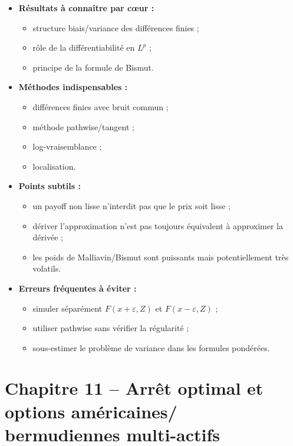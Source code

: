 \documentclass[11pt,a4paper]{article}
\begin{document}
\begin{itemize}
  \item \textbf{Résultats à connaître par cœur :}
  \begin{itemize}
    \item structure biais/variance des différences finies ;
    \item rôle de la différentiabilité en $L^p$ ;
    \item principe de la formule de Bismut.
  \end{itemize}
  \item \textbf{Méthodes indispensables :}
  \begin{itemize}
    \item différences finies avec bruit commun ;
    \item méthode pathwise/tangent ;
    \item log-vraisemblance ;
    \item localisation.
  \end{itemize}
  \item \textbf{Points subtils :}
  \begin{itemize}
    \item un payoff non lisse n'interdit pas que le prix soit lisse ;
    \item dériver l'approximation n'est pas toujours équivalent à approximer la dérivée ;
    \item les poids de Malliavin/Bismut sont puissants mais potentiellement très volatils.
  \end{itemize}
  \item \textbf{Erreurs fréquentes à éviter :}
  \begin{itemize}
    \item simuler séparément $F(x+\varepsilon,Z)$ et $F(x-\varepsilon,Z)$ ;
    \item utiliser pathwise sans vérifier la régularité ;
    \item sous-estimer le problème de variance dans les formules pondérées.
  \end{itemize}
\end{itemize}

\section[Chapitre 11 -- Arrêt optimal et options américaines/bermudiennes multi-actifs]{Chapitre 11 -- Arrêt optimal et options américaines/\\bermudiennes multi-actifs}
\end{document}
